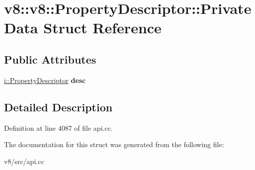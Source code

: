 \hypertarget{structv8_1_1v8_1_1PropertyDescriptor_1_1PrivateData}{}\section{v8\+:\+:v8\+:\+:Property\+Descriptor\+:\+:Private\+Data Struct Reference}
\label{structv8_1_1v8_1_1PropertyDescriptor_1_1PrivateData}
\subsection*{Public Attributes}
\begin{DoxyCompactItemize}
\item 
\mbox{\label{structv8_1_1v8_1_1PropertyDescriptor_1_1PrivateData_ac814421aa8e23204383dc60e3ca47ee7}} 
\mbox{\hyperlink{classv8_1_1internal_1_1PropertyDescriptor}{i\+::\+Property\+Descriptor}} {\bfseries desc}
\end{DoxyCompactItemize}


\subsection{Detailed Description}


Definition at line 4087 of file api.\+cc.



The documentation for this struct was generated from the following file\+:\begin{DoxyCompactItemize}
\item 
v8/src/api.\+cc\end{DoxyCompactItemize}
